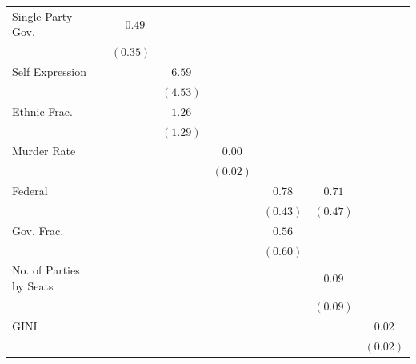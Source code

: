 \documentclass[a4paper]{article}\usepackage[]{graphicx}\usepackage[]{color}
\begin{document}
\begin{table}
\begin{center}
\begin{tabular}{l c c c c c c c }
Single Party Gov.       &               & $-0.49$      &              &               &              &              &             \\
                        &               & $(0.35)$     &              &               &              &              &             \\
Self Expression         &               &              & $6.59$       &               &              &              &             \\
                        &               &              & $(4.53)$     &               &              &              &             \\
Ethnic Frac.            &               &              & $1.26$       &               &              &              &             \\
                        &               &              & $(1.29)$     &               &              &              &             \\
Murder Rate             &               &              &              & $0.00$        &              &              &             \\
                        &               &              &              & $(0.02)$      &              &              &             \\
Federal                 &               &              &              &               & $0.78$       & $0.71$       &             \\
                        &               &              &              &               & $(0.43)$     & $(0.47)$     &             \\
Gov. Frac.              &               &              &              &               & $0.56$       &              &             \\
                        &               &              &              &               & $(0.60)$     &              &             \\
No. of Parties by Seats &               &              &              &               &              & $0.09$       &             \\
                        &               &              &              &               &              & $(0.09)$     &             \\
GINI                    &               &              &              &               &              &              & $0.02$      \\
                        &               &              &              &               &              &              & $(0.02)$    \\

\end{tabular}
\end{center}
\end{table}
\end{document}
